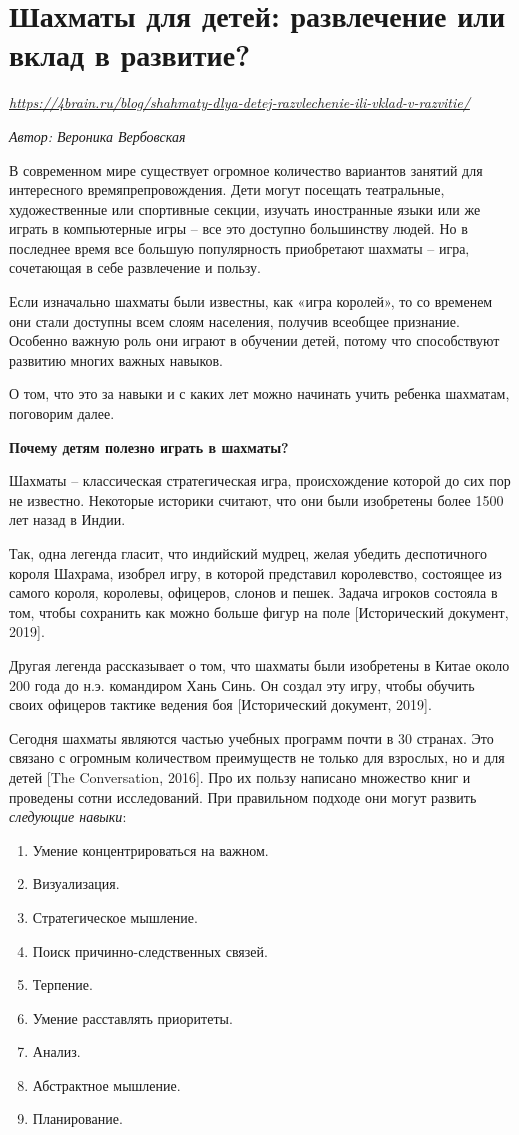 \newpage
\section{Шахматы для детей: развлечение или вклад в развитие?}

\textit{\url{https://4brain.ru/blog/shahmaty-dlya-detej-razvlechenie-ili-vklad-v-razvitie/}}

\textit{Автор: Вероника Вербовская}

В современном мире существует огромное количество вариантов занятий для интересного времяпрепровождения. Дети могут посещать театральные, художественные или спортивные секции, изучать иностранные языки или же играть в компьютерные игры – все это доступно большинству людей. Но в последнее время все большую популярность приобретают шахматы – игра, сочетающая в себе развлечение и пользу.

Если изначально шахматы были известны, как «игра королей», то со временем они стали доступны всем слоям населения, получив всеобщее признание. Особенно важную роль они играют в обучении детей, потому что способствуют развитию многих важных навыков.

О том, что это за навыки и с каких лет можно начинать учить ребенка шахматам, поговорим далее.

\textbf{Почему детям полезно играть в шахматы?}

Шахматы – классическая стратегическая игра, происхождение которой до сих пор не известно. Некоторые историки считают, что они были изобретены более 1500 лет назад в Индии.

Так, одна легенда гласит, что индийский мудрец, желая убедить деспотичного короля Шахрама, изобрел игру, в которой представил королевство, состоящее из самого короля, королевы, офицеров, слонов и пешек. Задача игроков состояла в том, чтобы сохранить как можно больше фигур на поле [Исторический документ, 2019].

Другая легенда рассказывает о том, что шахматы были изобретены в Китае около 200 года до н.э. командиром Хань Синь. Он создал эту игру, чтобы обучить своих офицеров тактике ведения боя  [Исторический документ, 2019].

Сегодня шахматы являются частью учебных программ почти в 30 странах. Это связано с огромным количеством преимуществ не только для взрослых, но и для детей [The Conversation, 2016]. Про их пользу написано множество книг и проведены сотни исследований. При правильном подходе они могут развить \textit{следующие навыки}:
\begin{enumerate}
    \item Умение концентрироваться на важном.
    \item Визуализация.
    \item Стратегическое мышление.
    \item Поиск причинно-следственных связей.
    \item Терпение.
    \item Умение расставлять приоритеты.
    \item Анализ.
    \item Абстрактное мышление.
    \item Планирование.
\end{enumerate}

